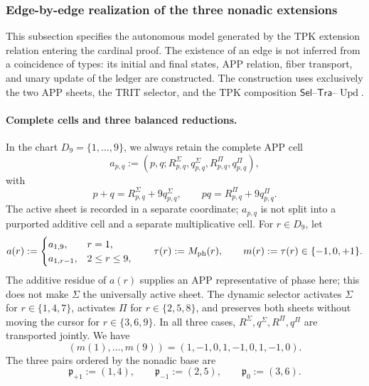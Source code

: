 \subsubsection{Edge-by-edge realization of the three nonadic extensions}
\label{subsubsec:tres-vueltas-ext-ch}

This subsection specifies the autonomous model generated by the TPK extension
relation entering the cardinal proof. The existence of an edge is not inferred
from a coincidence of types: its initial and final states, APP relation, fiber
transport, and unary update of the ledger are constructed. The construction
uses exclusively the two APP sheets, the TRIT selector, and the TPK
composition \(\mathsf{Sel}\)--\(\mathsf{Tra}\)--\(\operatorname{Upd}\).

\paragraph{Complete cells and three balanced reductions.}
In the chart \(D_9=\{1,\ldots,9\}\), we always retain the complete APP cell
\[
 a_{p,q}:=(p,q;R^\Sigma_{p,q},q^\Sigma_{p,q},
                 R^\Pi_{p,q},q^\Pi_{p,q}),
\]
with
\[
 p+q=R^\Sigma_{p,q}+9q^\Sigma_{p,q},\qquad
 pq=R^\Pi_{p,q}+9q^\Pi_{p,q}.
\]
The active sheet is recorded in a separate coordinate; \(a_{p,q}\) is not
split into a purported additive cell and a separate multiplicative cell. For
\(r\in D_9\), let
\begin{equation}
 a(r):=
 \begin{cases}
  a_{1,9},&r=1,\\
  a_{1,r-1},&2\le r\le9,
 \end{cases}
 \qquad
 \tau(r):=M_{\rm ph}(r),
 \qquad
 m(r):=\tau(r)\in\{-1,0,+1\}.
 \label{eq:celula-completa-fase-ch}
\end{equation}
The additive residue of \(a(r)\) supplies an APP representative of phase
here; this does not make \(\Sigma\) the universally active sheet. The dynamic
selector activates \(\Sigma\) for \(r\in\{1,4,7\}\), activates \(\Pi\) for
\(r\in\{2,5,8\}\), and preserves both sheets without moving the cursor for
\(r\in\{3,6,9\}\). In all three cases,
\(R^\Sigma,q^\Sigma,R^\Pi,q^\Pi\) are transported jointly. We have
\[
 (m(1),\ldots,m(9))=(1,-1,0,1,-1,0,1,-1,0).
\]
The three pairs ordered by the nonadic base are
\begin{equation}
 \mathfrak p_{+1}:=(1,4),\qquad
 \mathfrak p_{-1}:=(2,5),\qquad
 \mathfrak p_{0}:=(3,6).
 \label{eq:tres-pares-internos-ch}
\end{equation}
